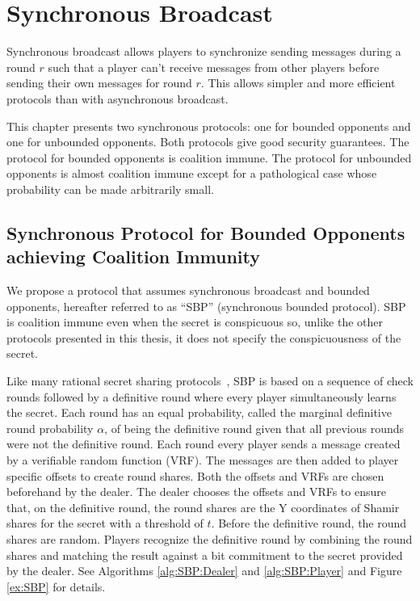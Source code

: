 \documentclass[12pt]{dalcsthesis}
\begin{document}
\chapter{Synchronous Broadcast}
\label{chapter:Synchronous}

Synchronous broadcast allows players to synchronize sending messages during a round $r$ such that a player can't receive messages from other players before sending their own messages for round $r$. This allows simpler and more efficient protocols than with asynchronous broadcast.

This chapter presents two synchronous protocols: one for bounded opponents and one for unbounded opponents. Both protocols give good security guarantees. The protocol for bounded opponents is coalition immune. The protocol for unbounded opponents is almost coalition immune except for a pathological case whose probability can be made arbitrarily small.



\section{Synchronous Protocol for Bounded Opponents achieving Coalition Immunity}

We propose a protocol that assumes synchronous broadcast and bounded opponents, hereafter referred to as ``SBP'' (synchronous bounded protocol). SBP is coalition immune even when the secret is conspicuous so, unlike the other protocols presented in this thesis, it does not specify the conspicuousness of the secret.

Like many rational secret sharing protocols~\cite{fuch10, halpern04, kol08}, SBP is based on a sequence of check rounds followed by a definitive round where every player simultaneously learns the secret. Each round has an equal probability, called the marginal definitive round probability $\alpha$, of being the definitive round given that all previous rounds were not the definitive round. Each round every player sends a message created by a verifiable random function (VRF). The messages are then added to player specific offsets to create round shares. Both the offsets and VRFs are chosen beforehand by the dealer. The dealer chooses the offsets and VRFs to ensure that, on the definitive round, the round shares are the Y coordinates of Shamir shares for the secret with a threshold of $t$. Before the definitive round, the round shares are random. Players recognize the definitive round by combining the round shares and matching the result against a bit commitment to the secret provided by the dealer. See Algorithms \ref{alg:SBP:Dealer} and \ref{alg:SBP:Player} and Figure \ref{ex:SBP} for details.
\end{document}
